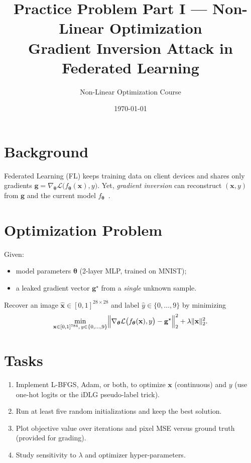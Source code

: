 \documentclass[12pt]{article}
\title{Practice Problem Part I — Non-Linear Optimization\\Gradient Inversion Attack in Federated Learning}
\author{Non-Linear Optimization Course}
\date{\today}
\begin{document}
\maketitle
\section*{Background}
Federated Learning (FL) keeps training data on client devices and shares only gradients
\(\mathbf g = \nabla_{\boldsymbol\theta}\mathcal L\bigl(f_{\boldsymbol\theta}(\mathbf x),y\bigr)\).
Yet, \emph{gradient inversion} can reconstruct \((\mathbf x,y)\) from \(\mathbf g\) and the current model
\(f_{\boldsymbol\theta}\)~\cite{zhu2019dlg,zhu2020idlg,zhu2024dlgfb,guo2025survey}.

\section*{Optimization Problem}
Given:
\begin{itemize}[nosep]
  \item model parameters \(\boldsymbol\theta\) (2-layer MLP, trained on MNIST);
  \item a leaked gradient vector \(\mathbf g^\star\) from a \emph{single} unknown sample.
\end{itemize}
Recover an image \(\hat{\mathbf x}\!\in[0,1]^{28\times28}\) and label
\(\hat y\!\in\!\{0,\dots,9\}\) by minimizing
\[
\min_{\mathbf x\in[0,1]^{784},\,y\in\{0,\dots,9\}}
\Bigl\lVert
\nabla_{\boldsymbol\theta}\mathcal L\bigl(f_{\boldsymbol\theta}(\mathbf x),y\bigr)
-\mathbf g^\star
\Bigr\rVert_2^2
+\lambda\|\mathbf x\|_2^2 .
\]

\section*{Tasks}
\begin{enumerate}[label=\textbf{\arabic*.}, nosep]
  \item Implement L-BFGS, Adam, or both, to optimize \(\mathbf x\) (continuous) and \(y\)
        (use one-hot logits or the iDLG pseudo-label trick).
  \item Run at least five random initializations and keep the best solution.
  \item Plot objective value over iterations and pixel MSE versus ground truth
        (provided for grading).
  \item Study sensitivity to \(\lambda\) and optimizer hyper-parameters.
\end{enumerate}
\end{document}

